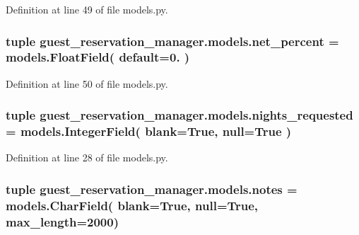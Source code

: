 Definition at line 49 of file models.\-py.

\hypertarget{namespaceguest__reservation__manager_1_1models_a5c8cf779a5de03e48a3b1f7971b7c1a6}{
\subsubsection[{net\-\_\-percent}]{\setlength{\rightskip}{0pt plus 5cm}tuple guest\-\_\-reservation\-\_\-manager.\-models.\-net\-\_\-percent = models.\-Float\-Field( default=0. )}}\label{namespaceguest__reservation__manager_1_1models_a5c8cf779a5de03e48a3b1f7971b7c1a6}


Definition at line 50 of file models.\-py.

\hypertarget{namespaceguest__reservation__manager_1_1models_ab93ac6c64d7f9a4c94e54b406feb4081}{
\subsubsection[{nights\-\_\-requested}]{\setlength{\rightskip}{0pt plus 5cm}tuple guest\-\_\-reservation\-\_\-manager.\-models.\-nights\-\_\-requested = models.\-Integer\-Field( blank=True, null=True )}}\label{namespaceguest__reservation__manager_1_1models_ab93ac6c64d7f9a4c94e54b406feb4081}


Definition at line 28 of file models.\-py.

\hypertarget{namespaceguest__reservation__manager_1_1models_a9beda3157c594b7886c91873a67f444f}{
\subsubsection[{notes}]{\setlength{\rightskip}{0pt plus 5cm}tuple guest\-\_\-reservation\-\_\-manager.\-models.\-notes = models.\-Char\-Field( blank=True, null=True, max\-\_\-length=2000)}}\label{namespaceguest__reservation__manager_1_1models_a9beda3157c594b7886c91873a67f444f}


